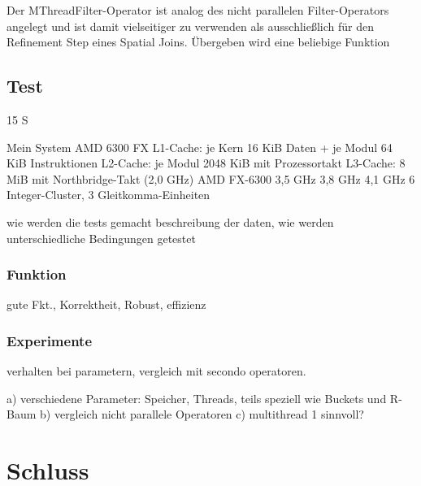 \documentclass[a4paper,12pt,twoside]{article}
\begin{document}
Der MThreadFilter-Operator ist analog des nicht parallelen Filter-Operators angelegt und ist damit vielseitiger zu verwenden als ausschließlich für den Refinement Step eines Spatial Joins. Übergeben wird eine beliebige Funktion

\subsection{Test} 15 S

Mein System AMD 6300 FX
L1-Cache: je Kern 16 KiB Daten + je Modul 64 KiB Instruktionen
L2-Cache: je Modul 2048 KiB mit Prozessortakt
L3-Cache: 8 MiB mit Northbridge-Takt (2,0 GHz)
AMD FX-6300 	3,5 GHz 	3,8 GHz 	4,1 GHz
6 Integer-Cluster, 3 Gleitkomma-Einheiten

wie werden die tests gemacht
beschreibung der daten, wie werden unterschiedliche Bedingungen getestet

\subsubsection{Funktion}
gute Fkt., Korrektheit, Robust, effizienz


\subsubsection{Experimente}
verhalten bei parametern, vergleich mit secondo operatoren.

a) verschiedene Parameter: Speicher, Threads, teils speziell wie Buckets und R-Baum 
b) vergleich nicht parallele Operatoren
c) multithread 1 sinnvoll?

\section{Schluss}

\pagebreak 
\printbibliography
\end{document}
